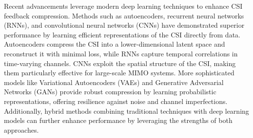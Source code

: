 \documentclass[lettersize,journal]{IEEEtran}
\begin{document}
Recent advancements leverage modern deep learning techniques to enhance CSI feedback compression. Methods such as autoencoders, recurrent neural networks (RNNs), and convolutional neural networks (CNNs) have demonstrated superior performance by learning efficient representations of the CSI directly from data. Autoencoders compress the CSI into a lower-dimensional latent space and reconstruct it with minimal loss, while RNNs capture temporal correlations in time-varying channels. CNNs exploit the spatial structure of the CSI, making them particularly effective for large-scale MIMO systems. More sophisticated models like Variational Autoencoders (VAEs) and Generative Adversarial Networks (GANs) provide robust compression by learning probabilistic representations, offering resilience against noise and channel imperfections. Additionally, hybrid methods combining traditional techniques with deep learning models can further enhance performance by leveraging the strengths of both approaches.
\end{document}
